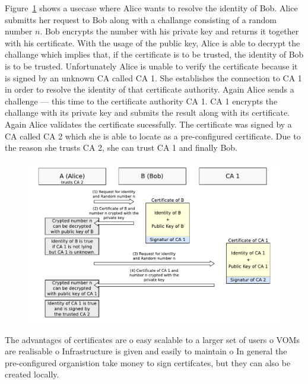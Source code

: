 Figure~\ref{fig:verification_of_certificates} shows a usecase where Alice wants to resolve the identity of Bob. Alice submitts her request to Bob along with a challange consisting of a random number $n$. Bob encrypts the number with his private key and returns it together with his certificate. With the usage of the public key, Alice is able to decrypt the challange which implies that, if the certificate is to be trusted, the identity of Bob is to be trusted. Unfortunately Alice is unable to verify the certificate because it is signed by an unknown CA called CA 1. She establishes the connection to CA 1 in order to resolve the identity of that certificate authority. Again Alice sends a challenge --- this time to the certificate authority CA 1. CA 1 encrypts the challange with its private key and submits the result along with its certificate. Again Alice validates the certificate sucessfully. 
The certificate was signed by a CA called CA 2 which she is able to locate as a pre-configured certificate. Due to the reason she trusts CA 2, she can trust CA 1 and finally Bob. 

\begin{figure}[htb]
	\centering%
	\includegraphics[width=13cm]{tex_tls_echoservice/verification.pdf}
	\label{fig:verification_of_certificates}
\end{figure}



The advantages of certificates are
o easy scalable to a larger set of users
o VOMs are realisable
o Infrastructure is given and easily to maintain
o In general the pre-configured organistion take money to sign certifcates, but they can also be created locally.



